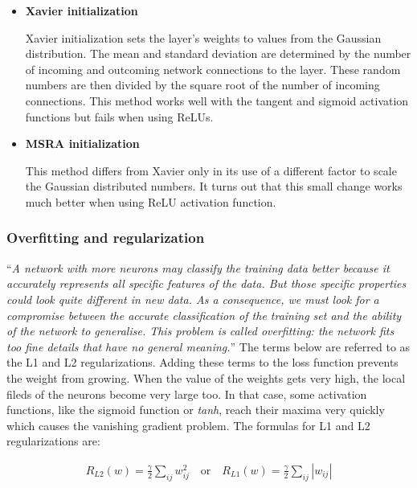 \begin{itemize}
	\item \textbf{Xavier initialization}
		
	Xavier initialization sets the layer’s weights to values from the Gaussian distribution. The mean and standard deviation are determined by the number of incoming and outcoming network connections to the layer. These random numbers are then divided by the square root of the number of incoming connections. This method works well with the tangent and sigmoid activation functions but fails when using ReLUs. \cite{stanford-L6}
	
	\item \textbf{MSRA initialization}

	This method differs from Xavier only in its use of a different factor to scale the Gaussian distributed numbers. It turns out that this small change works much better when using ReLU activation function. \cite{stanford-L6}
	
\end{itemize}

\subsubsection{Overfitting and regularization}

\enquote{\textit{A network with more neurons may classify the training data better because it accurately represents all specific features of the data. But those specific properties could look quite different in new data. As a consequence, we must look for a compromise between the accurate classification of the training set and the ability of the network to generalise. This problem is called overfitting: the network fits too fine details that have no general meaning.}} \cite{mehlig} The terms below are referred to as the L1 and L2 regularizations. Adding these terms to the loss function prevents the weight from growing. When the value of the weights gets very high, the local fileds of the neurons become very large too. In that case, some activation functions, like the sigmoid function or \textit{tanh}, reach their maxima very quickly which causes the vanishing gradient problem. The formulas for L1 and L2 regularizations are: \cite{mehlig}

\begin{gather}
	R_{L2}(w) = \frac{\gamma}{2} \sum\limits_{ij} w_{ij}^{2} \quad \text{or} \quad R_{L1}(w) = \frac{\gamma}{2} \sum\limits_{ij} |w_{ij}|
\end{gather}

